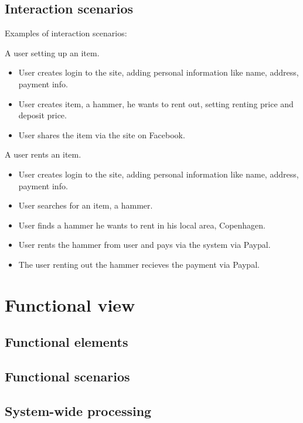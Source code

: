 \documentclass[a4paper,11pt]{report}
\begin{document}
\subsection{Interaction scenarios}
\label{sec:inter-scen}
Examples of interaction scenarios:

A user setting up an item.
\begin{itemize}
  \item User creates login to the site, adding personal information like name, address, payment info.
  \item User creates item, a hammer, he wants to rent out, setting renting price and deposit price.
  \item User shares the item via the site on Facebook.
\end{itemize}

A user rents an item.
\begin{itemize}
  \item User creates login to the site, adding personal information like name, address, payment info.
  \item User searches for an item, a hammer.
  \item User finds a hammer he wants to rent in his local area, Copenhagen.
  \item User rents the hammer from user and pays via the system via Paypal.
  \item The user renting out the hammer recieves the payment via Paypal.
\end{itemize}

\section{Functional view}
\label{sec:functional-view}


\subsection{Functional elements}
\label{sec:functional-elements}


\subsection{Functional scenarios}
\label{sec:functional-scenarios-1}


\subsection{System-wide processing}
\label{sec:syst-wide-proc}
\end{document}
